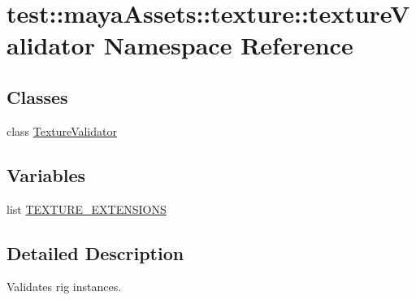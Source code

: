 \hypertarget{namespacetest_1_1mayaAssets_1_1texture_1_1textureValidator}{\section{test\-:\-:maya\-Assets\-:\-:texture\-:\-:texture\-Validator \-Namespace \-Reference}
\label{dd/d6e/namespacetest_1_1mayaAssets_1_1texture_1_1textureValidator}
}
\subsection*{\-Classes}
\begin{DoxyCompactItemize}
\item 
class \hyperlink{classtest_1_1mayaAssets_1_1texture_1_1textureValidator_1_1TextureValidator}{\-Texture\-Validator}
\end{DoxyCompactItemize}
\subsection*{\-Variables}
\begin{DoxyCompactItemize}
\item 
list \hyperlink{namespacetest_1_1mayaAssets_1_1texture_1_1textureValidator_a261a761ef073c677bdc19beca68e6276}{\-T\-E\-X\-T\-U\-R\-E\-\_\-\-E\-X\-T\-E\-N\-S\-I\-O\-N\-S}
\end{DoxyCompactItemize}


\subsection{\-Detailed \-Description}
\begin{DoxyVerb}
Validates rig instances.
\end{DoxyVerb}
 

